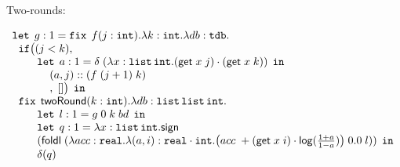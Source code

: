 \newpage
\begin{figure}
\small
Two-rounds:

\[
\begin{array}{l}
  \mathop{\mathtt{let}} \;  g: 1 = 
  \mathop{\mathtt{fix}} \; f(j: \mathtt{int}). \lambda k: \mathtt{int}. \lambda db: \mathtt{tdb}.\\
  \hspace{.2cm}  \mathtt{if} \big (  (j < k)  ,  \\
  \hspace{.8cm}  \mathop{\mathtt{let}} \;  a: 1 = 
                 \delta \;  
                 (\lambda x: \mathtt{list} \, \mathtt{int}. 
                 (\mathsf{get} \; x \; j) \cdot (\mathsf{get} \; x \; k) ) 
                  \; \mathop{ \mathtt{in}} \\
  \hspace{1.2cm} (a, j) :: (f  \; (j+1) \;  k) \\
  \hspace{1.2cm} ,\;  [] \big) \; \mathop{ \mathtt{in}}\\
  \hspace{.2cm}  \mathop{\mathtt{fix}} \; \mathsf{twoRound}(k : \mathtt{int}). 
                 \lambda db:\mathtt{list} \, \mathtt{list} \, \mathtt{int}.\\
  \hspace{.8cm}  \mathop{\mathtt{let}} \;  l: 1 = g \;  0 \;  k \; bd \;  \mathop{ \mathtt{in}} \\
  \hspace{.8cm}  \mathop{\mathtt{let}} \;  q: 1 =  \lambda x: \mathtt{list} \, \mathtt{int}. \mathsf{sign} \; \\ 
  \hspace{.8cm}  (\mathsf{foldl} \;  (\lambda acc: \mathtt{real}. 
                 \lambda (a,i): \mathtt{real} \cdot \mathtt{int}. 
                 \big(acc\; + (\mathsf{get} \; x \;  i) 
                 \cdot \mathsf{log}(\frac{1+a}{1-a}) \big)
                 \;  0.0 \;  l )) \;  \mathop{ \mathtt{in}} \\
  \hspace{.8cm}  \delta ( q )
\end{array}
\]
\end{figure}


